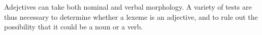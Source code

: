Adejctives can take both nominal and verbal morphology. A variety of tests are thus necessary to determine whether a lexeme is an adjective, and to rule out the possibility that it could be a noun or a verb.

 
% 
% 
% 
% 
% 
% 
% 
% 
% 
% 
